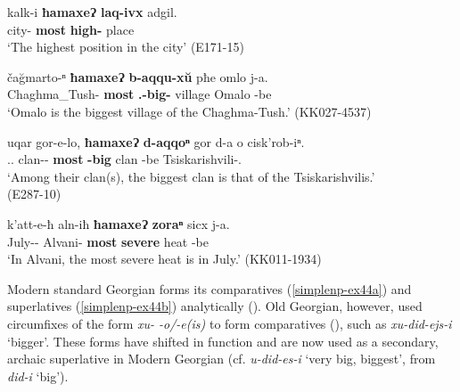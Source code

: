 \begin{exe}
	\ex\label{simplenp-ex17}
	\begin{xlist}
		
		\ex\label{simplenp-ex17a}
		\gll kalk-i \textbf{ħamaxeɁ} \textbf{laq-ivx} adgil. \\
		city-{\Iness} \textbf{most} \textbf{high-{\Cmp}} place \\
		\trans `The highest position in the city'
		\hfill (E171-15)
		
		\ex\label{simplenp-ex17b}
		\gll ča\u{g}marto-ⁿ \textbf{ħamaxeɁ} \textbf{b-aqqu-x\u{u}} pħe omlo j-a. \\
		Chaghma\_Tush-{\Gen} \textbf{most} \textbf{{\B}.{\Sg}-big-{\Cmp}} village Omalo {\J}-be \\
		\trans `Omalo is the biggest village of the Chaghma-Tush.'
		\hfill (KK027-4537)
		
		\ex\label{simplenp-ex17c}
		\gll uqar gor-e-lo, \textbf{ħamaxeɁ} \textbf{d-aqqoⁿ} gor d-a o cisk'rob-iⁿ. \\
		{\Dist}.{\Pl}.{\Obl} clan-{\Obl}-{\Interess} \textbf{most} \textbf{{\D}-big} clan {\D}-be {\Dist} Tsiskarishvili-{\Gen}.{\Pl} \\
		\trans `Among their clan(s), the biggest clan is that of the Tsiskarishvilis.' \\
		\hfill (E287-10)
		
		\ex\label{simplenp-ex17d}
		\gll k'att-e-ħ aln-iħ \textbf{ħamaxeɁ} \textbf{zoraⁿ} sicx j-a. \\
		July-{\Obl}-{\Ess} Alvani-{\Iness} \textbf{most} \textbf{severe} heat {\J}-be \\
		\trans `In Alvani, the most severe heat is in July.'
		\hfill (KK011-1934)
		
	\end{xlist}
\end{exe}


Modern standard Georgian forms its comparatives (\ref{simplenp-ex44a}) and superlatives (\ref{simplenp-ex44b}) analytically (\cite[236]{vogt}). Old Georgian, however, used circumfixes of the form \textit{xu- -o/-e(is)} to form comparatives (\cite{gippert2000compar}), such as \textit{xu-did-ejs-i} `bigger'. These forms have shifted in function and are now used as a secondary, archaic superlative in Modern Georgian (cf. \textit{u-did-es-i} `very big, biggest', from \textit{did-i} `big').

